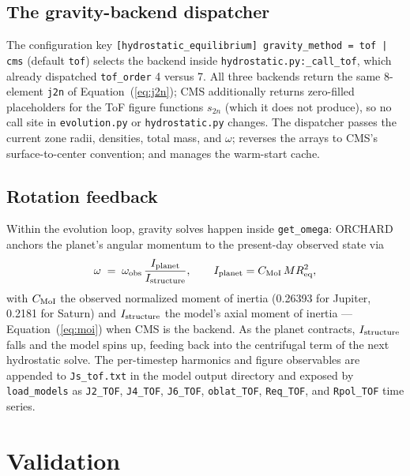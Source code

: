 \documentclass{aastex631}
\newcommand{\Req}{R_{\rm eq}}
\begin{document}
\subsection{The gravity-backend dispatcher}

The configuration key \texttt{[hydrostatic\_equilibrium]
gravity\_method = tof | cms} (default \texttt{tof}) selects the backend
inside \texttt{hydrostatic.py:\_call\_tof}, which already dispatched
\texttt{tof\_order} 4 versus 7.  All three backends return the same
8-element \texttt{j2n} of Equation~(\ref{eq:j2n}); CMS additionally
returns zero-filled placeholders for the ToF figure functions $s_{2n}$
(which it does not produce), so no call site in \texttt{evolution.py} or
\texttt{hydrostatic.py} changes.  The dispatcher passes the current
zone radii, densities, total mass, and $\omega$; reverses the arrays to
CMS's surface-to-center convention; and manages the warm-start cache.

\subsection{Rotation feedback}

Within the evolution loop, gravity solves happen inside
\texttt{get\_omega}: ORCHARD anchors the planet's angular momentum to
the present-day observed state via
\begin{equation}
\omega \;=\; \omega_{\rm obs}\,
\frac{I_{\rm planet}}{I_{\rm structure}},
\qquad I_{\rm planet} = C_{\rm MoI}\, M \Req^2 ,
\label{eq:spin}
\end{equation}
with $C_{\rm MoI}$ the observed normalized moment of inertia (0.26393
for Jupiter, 0.2181 for Saturn) and $I_{\rm structure}$ the model's
axial moment of inertia --- Equation~(\ref{eq:moi}) when CMS is the
backend.  As the planet contracts, $I_{\rm structure}$ falls and the
model spins up, feeding back into the centrifugal term of the next
hydrostatic solve.  The per-timestep harmonics and figure observables
are appended to \texttt{Js\_tof.txt} in the model output directory and
exposed by \texttt{load\_models} as \texttt{J2\_TOF}, \texttt{J4\_TOF},
\texttt{J6\_TOF}, \texttt{oblat\_TOF}, \texttt{Req\_TOF}, and
\texttt{Rpol\_TOF} time series.

\section{Validation}\label{sec:validation}
\end{document}
